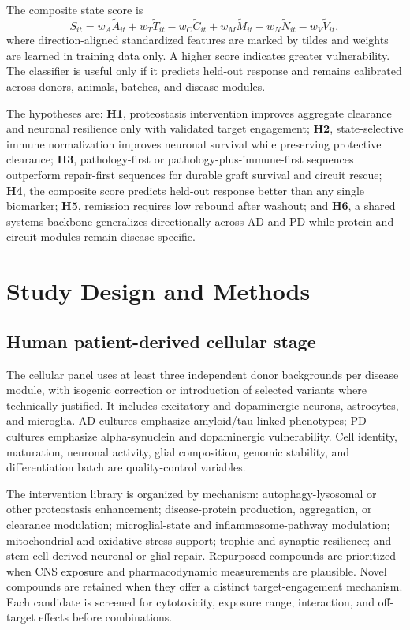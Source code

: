 \documentclass[conference]{IEEEtran}
\begin{document}
The composite state score is
\begin{equation}
S_{it}=w_A\tilde{A}_{it}+w_T\tilde{T}_{it}-w_C\tilde{C}_{it}+w_M\tilde{M}_{it}-w_N\tilde{N}_{it}-w_V\tilde{V}_{it},
\label{eq:score}
\end{equation}
where direction-aligned standardized features are marked by tildes and weights are learned in training data only. A higher score indicates greater vulnerability. The classifier is useful only if it predicts held-out response and remains calibrated across donors, animals, batches, and disease modules.

The hypotheses are: \textbf{H1}, proteostasis intervention improves aggregate clearance and neuronal resilience only with validated target engagement; \textbf{H2}, state-selective immune normalization improves neuronal survival while preserving protective clearance; \textbf{H3}, pathology-first or pathology-plus-immune-first sequences outperform repair-first sequences for durable graft survival and circuit rescue; \textbf{H4}, the composite score predicts held-out response better than any single biomarker; \textbf{H5}, remission requires low rebound after washout; and \textbf{H6}, a shared systems backbone generalizes directionally across AD and PD while protein and circuit modules remain disease-specific.

\section{Study Design and Methods}
\subsection{Human patient-derived cellular stage}
The cellular panel uses at least three independent donor backgrounds per disease module, with isogenic correction or introduction of selected variants where technically justified. It includes excitatory and dopaminergic neurons, astrocytes, and microglia. AD cultures emphasize amyloid/tau-linked phenotypes; PD cultures emphasize alpha-synuclein and dopaminergic vulnerability. Cell identity, maturation, neuronal activity, glial composition, genomic stability, and differentiation batch are quality-control variables.

The intervention library is organized by mechanism: autophagy-lysosomal or other proteostasis enhancement; disease-protein production, aggregation, or clearance modulation; microglial-state and inflammasome-pathway modulation; mitochondrial and oxidative-stress support; trophic and synaptic resilience; and stem-cell-derived neuronal or glial repair. Repurposed compounds are prioritized when CNS exposure and pharmacodynamic measurements are plausible. Novel compounds are retained when they offer a distinct target-engagement mechanism. Each candidate is screened for cytotoxicity, exposure range, interaction, and off-target effects before combinations.
\end{document}
